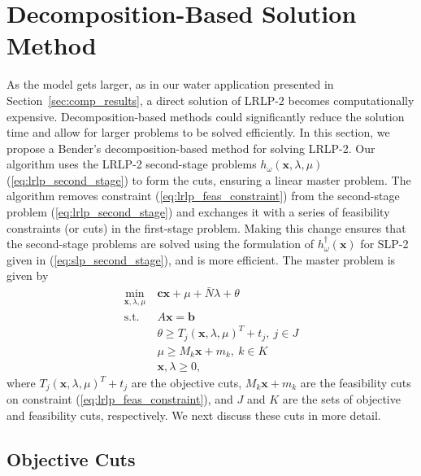 \documentclass[11pt]{article}
\newcommand{\x}{\mathbf{x}}
\renewcommand{\c}{\mathbf{c}}
\renewcommand{\b}{\mathbf{b}}
\newcommand{\st}{\mbox{s.t.}}
\begin{document}
\section{Decomposition-Based Solution Method} \label{sec:soln_algorithm}

As the model gets larger, as in our water application presented in Section~\ref{sec:comp_results}, a direct solution of LRLP-2 becomes computationally expensive. 
Decomposition-based methods could significantly reduce the solution time and allow for larger problems to be solved efficiently. In this section, we propose a Bender's decomposition-based method for solving LRLP-2.
Our algorithm uses the LRLP-2 second-stage problems $h_\omega(\x,\lambda,\mu)$ (\ref{eq:lrlp_second_stage}) to form the cuts, ensuring a linear master problem.
The algorithm removes constraint (\ref{eq:lrlp_feas_constraint}) from the second-stage problem (\ref{eq:lrlp_second_stage}) and exchanges it with a series of feasibility constraints (or cuts) in the first-stage problem.
Making this change ensures that the second-stage problems are solved using the formulation of $h^\dagger_\omega(\x)$ for SLP-2 given in  (\ref{eq:slp_second_stage}), and is more efficient.
The master problem is given by
\begin{align}
	\min_{\x,\lambda,\mu} \ & \c\x + \mu + \bar{N}\lambda + \theta \label{eq:master_problem}\\
	\st \ & A\x = \b \nonumber \\
	& \theta \geq T_j (\x,\lambda,\mu)^T + t_j, \ j \in J \nonumber \\
	& \mu \geq M_k \x + m_k, \ k \in K \nonumber \\
	& \x,\lambda \geq 0, \nonumber
\end{align}
where $T_j (\x,\lambda,\mu)^T + t_j$ are the objective cuts, $M_k \x + m_k$ are the feasibility cuts on constraint (\ref{eq:lrlp_feas_constraint}), and $J$ and $K$ are the sets of objective and feasibility cuts, respectively.
We next discuss these cuts in more detail.

\subsection{Objective Cuts}
\end{document}
